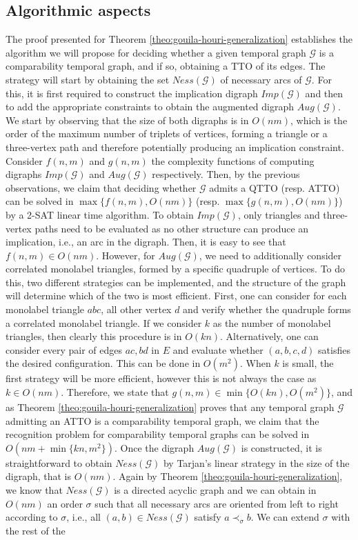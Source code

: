 \documentclass[runningheads]{llncs}
\begin{document}
\subsection{Algorithmic aspects}
\label{subsect:algorithmic-aspects}

The proof presented for Theorem \ref{theo:gouila-houri-generalization} establishes the algorithm we will propose for deciding whether a given temporal graph $\mathcal{G}$ is a comparability temporal graph, and if so, obtaining a TTO of its edges. The strategy will start by obtaining the set $Ness(\mathcal{G})$ of necessary arcs of $\mathcal{G}$. For this, it is first required to construct the implication digraph $Imp(\mathcal{G})$ and then to add the appropriate constraints to obtain the augmented digraph $Aug(\mathcal{G})$. We start by observing that the size of both digraphs is in $O(nm)$, which is the order of the maximum number of triplets of vertices, forming a triangle or a three-vertex path and therefore potentially producing an implication constraint. Consider $f(n,m)$ and $g(n,m)$ the complexity functions of computing digraphs $Imp(\mathcal{G})$ and $Aug(\mathcal{G})$ respectively. Then, by the previous observations, we claim that deciding whether $\mathcal{G}$ admits a QTTO (resp. ATTO) can be solved in $\max\{f(n,m), O(nm)\}$ (resp. $\max\{g(n,m), O(nm)\}$) by a 2-SAT linear time algorithm. To obtain $Imp(\mathcal{G})$, only triangles and three-vertex paths need to be evaluated as no other structure can produce an implication, i.e., an arc in the digraph. Then, it is easy to see that $f(n,m) \in O(nm)$. However, for $Aug(\mathcal{G})$, we need to additionally consider correlated monolabel triangles, formed by a specific quadruple of vertices. To do this, two different strategies can be implemented, and the structure of the graph will determine which of the two is most efficient. First, one can consider for each monolabel triangle $abc$, all other vertex $d$ and verify whether the quadruple forms a correlated monolabel triangle. If we consider $k$ as the number of monolabel triangles, then clearly this procedure is in $O(kn)$. Alternatively, one can consider every pair of edges $ac, bd$ in $E$ and evaluate whether $(a,b,c,d)$ satisfies the desired configuration. This can be done in $O(m^2)$. When $k$ is small, the first strategy will be more efficient, however this is not always the case as $k \in O(nm)$. Therefore, we state that $g(n,m) \in \min\{O(kn),O(m^2)\}$, and as Theorem \ref{theo:gouila-houri-generalization} proves that any temporal graph $\mathcal{G}$ admitting an ATTO is a comparability temporal graph, we claim that the recognition problem for comparability temporal graphs can be solved in $O(nm + \min\{kn,m^2\})$. Once the digraph $Aug(\mathcal{G})$ is constructed, it is straightforward to obtain $Ness(\mathcal{G})$ by Tarjan's \cite{Tarjan72} linear strategy in the size of the digraph, that is $O(nm)$. Again by Theorem \ref{theo:gouila-houri-generalization}, we know that $Ness(\mathcal{G})$ is a directed acyclic graph and we can obtain in $O(nm)$ an order $\sigma$ such that all necessary arcs are oriented from left to right according to $\sigma$, i.e., all $(a,b) \in Ness(\mathcal{G})$ satisfy $a \prec_{\sigma} b$. We can extend $\sigma$ with the rest of the 
\end{document}
